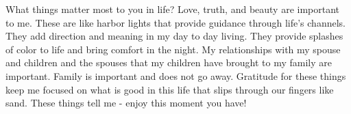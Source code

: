What things matter most to you in life?
Love, truth, and beauty are important to me.  These are like harbor lights that provide guidance through life's channels. They add direction and meaning in my day to day living. They provide splashes of color to life and bring comfort in the night.
My relationships with my spouse and children and the spouses that my children have brought to my family are important. Family is important and does not go away. 
Gratitude for these things keep me focused on what is good in this life that slips through our fingers like sand. These things tell me - enjoy this moment you have!





